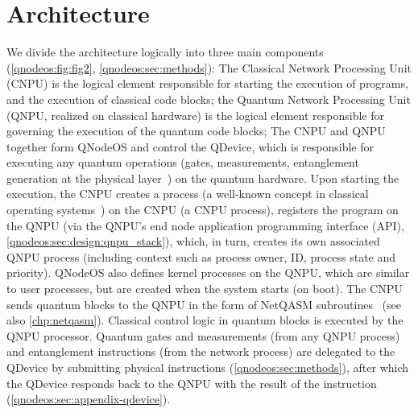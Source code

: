 \section{Architecture}
\label{qnodeos:sec:architecture}
We divide the architecture logically into three main components (\cref{qnodeos:fig:fig2}, \cref{qnodeos:sec:methods}):
The Classical Network Processing Unit (CNPU) is the logical element responsible for starting the execution of programs, and the execution of classical code blocks;
the Quantum Network Processing Unit (QNPU, realized on classical hardware) is the logical element responsible for governing the execution of the quantum code blocks;
The CNPU and QNPU together form QNodeOS and control the QDevice, which is responsible for executing any quantum operations (gates, measurements, entanglement generation at the physical layer~\cite{dahlberg_2019_egp}) on the quantum hardware.
Upon starting the execution, the CNPU creates a process (a well-known concept in classical operating systems~\cite{dennis_programming_1966-1,tanenbaum_operating_2005}) on the CNPU (a CNPU process), registers the program on the QNPU (via the QNPU's end node application programming interface (API), \cref{qnodeos:sec:design:qnpu_stack}), which, in turn, creates its own associated QNPU process (including context such as process owner, ID, process state and priority).
QNodeOS also defines kernel processes on the QNPU, which are similar to user processes, but are created when the system starts (on boot).
The CNPU sends quantum blocks to the QNPU in the form of NetQASM subroutines~\cite{dahlberg_2022_netqasm} (see also \cref{chp:netqasm}).
Classical control logic in quantum blocks is executed by the QNPU processor.
Quantum gates and measurements (from any QNPU process) and entanglement instructions (from the network process) are delegated to the QDevice by submitting physical instructions (\cref{qnodeos:sec:methods}), after which the QDevice responds back to the QNPU with the result of the instruction (\cref{qnodeos:sec:appendix-qdevice}). 

